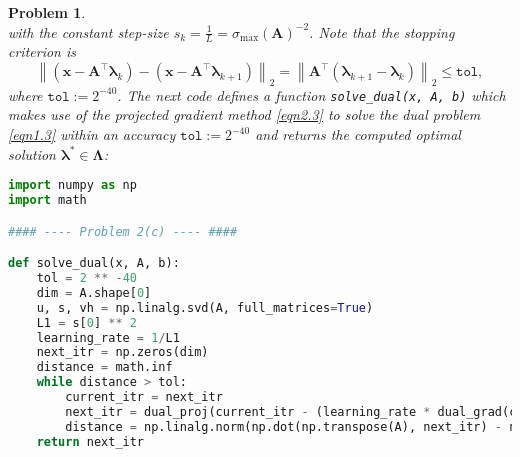 \documentclass[11pt]{article}
\newtheorem{problem}{Problem}
\begin{document}
\begin{problem}
{\begin{equation}
\end{equation}
with the constant step-size $s_k = \frac{1}{L} = \sigma_{\max} \left( \mathbf{A} \right)^{-2}$. Note that the stopping criterion is
\begin{equation*}
    \left\| \left( \mathbf{x} - \mathbf{A}^{\top} \bm{\lambda}_k \right) - \left( \mathbf{x} - \mathbf{A}^{\top} \bm{\lambda}_{k+1} \right) \right\|_{2} = \left\| \mathbf{A}^{\top} \left( \bm{\lambda}_{k+1} - \bm{\lambda}_k \right) \right\|_2 \leq \texttt{tol},
\end{equation*}
where $\texttt{tol} := 2^{-40}$. The next code defines a function \texttt{solve\_dual(x, A, b)} which makes use of the projected gradient method \eqref{eqn2.3} to solve the dual problem \eqref{eqn1.3} within an accuracy $\texttt{tol} := 2^{-40}$ and returns the computed optimal solution $\bm{\lambda}^* \in \bm{\Lambda}$:
\begin{lstlisting}[language = Python]
import numpy as np
import math

#### ---- Problem 2(c) ---- ####

def solve_dual(x, A, b):
    tol = 2 ** -40
    dim = A.shape[0]
    u, s, vh = np.linalg.svd(A, full_matrices=True)
    L1 = s[0] ** 2
    learning_rate = 1/L1
    next_itr = np.zeros(dim)
    distance = math.inf
    while distance > tol:
        current_itr = next_itr
        next_itr = dual_proj(current_itr - (learning_rate * dual_grad(current_itr, x, A, b)))
        distance = np.linalg.norm(np.dot(np.transpose(A), next_itr) - np.dot(np.transpose(A), current_itr), 2)
    return next_itr
\end{lstlisting}
}
\end{problem}
\end{document}
